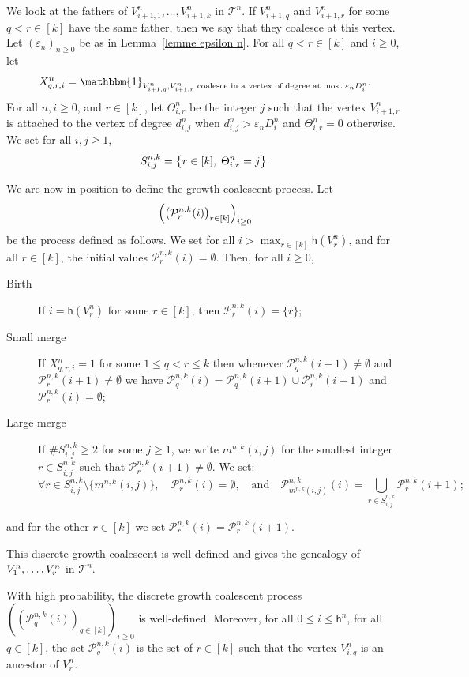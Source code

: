 \documentclass[10pt]{amsart}
\theoremstyle{definition}\newtheorem{defi}[theo]{Definition}\newtheorem{rema}[theo]{Remark}\newtheorem{exam}[theo]{Example}\newtheorem{exem}[theo]{Example}\newtheorem{nota}[theo]{Notation}
\newcommand{\e}{\varepsilon}
\newcommand{\1}{\mathbbm{1}}
\newcommand{\Part}{\mathcal{P}}
\newcommand{\T}{\mathcal{T}}
\newcommand{\h}{\mathsf{h}}
\let\originalleft\left
\let\originalright\right
\renewcommand{\left}{\mathopen{}\mathclose\bgroup\originalleft}
\renewcommand{\right}{\aftergroup\egroup\originalright}
\let\oldforall\forall
\renewcommand*{\forall}{\mathrel{\oldforall}}
\begin{document}
We look at the fathers of $V^n_{i+1,1}, \dots,V^n_{i+1,k}$ in $\T^n$. If $V^n_{i+1,q}$ and $V^n_{i+1,r}$ for some $q<r \in [k]$ have the same father, then we say that they coalesce at this vertex. Let $(\e_n)_{n\ge 0}$ be as in Lemma~\ref{lemme epsilon n}. For all $q<r \in [k]$ and $i \ge 0$, let
\begin{equation}\label{eq indicatrice petite coalescence}
X^n_{q,r,i} = \1_{V^n_{i+1,q}, V^n_{i+1,r}
\text{ coalesce in a vertex of degree at most } \e_n D^n_i}.
\end{equation}
For all $n,i\ge 0$, and $r \in [k]$, let $\Theta_{i,r}^n$ be the integer $j$ such that the vertex $V^n_{i+1,r}$ is attached to the vertex of degree $d^n_{i,j}$ when $d^n_{i,j}> \e_n D^n_i$ and $\Theta_{i,r}^n=0$ otherwise. We set for all $i,j \ge 1$,
\[
S^{n,k}_{i,j} = \left\{ r \in [k], \; \Theta^n_{i,r}=j\right\}.
\]

We are now in position to define the growth-coalescent process. Let 
\[
\left(\left(\Part^{n,k}_r(i)\right)_{r \in [k]}\right)_{i\ge 0}
\]
be the process defined as follows. We set for all $i >\max_{r \in [k]} \h(V^n_r)$, and for all $r \in [k]$, the initial values $ \Part^{n,k}_r(i) = \emptyset$. Then, for all $i\ge 0$,
\begin{description}
\item[{Birth}] If $i=\h(V^n_r)$ for some $r \in [k]$, then $\Part_r^{n,k}(i)=\{r\}$;
\item[{Small merge}] If $X^n_{q,r,i}=1$ for some $1 \le q<r\le k$ then whenever $\Part_q^{n,k}(i+1)\neq \emptyset$ and $\Part_{r}^{n,k}(i+1)\neq \emptyset$ we have $\Part_q^{n,k}(i)=\Part_q^{n,k}(i+1)\cup \Part_{r}^{n,k}(i+1)$ and $\Part_r^{n,k}(i)=\emptyset$;
\item[{Large merge}] If $\# S^{n,k}_{i,j} \ge 2$ for some $j\ge 1$, we write $m^{n,k}(i,j)$ for the smallest integer $r\in S^{n,k}_{i,j}$ such that $\Part_r^{n,k}(i+1)\neq \emptyset$. We set:
\[
\forall r \in S^{n,k}_{i,j} \setminus \{ m^{n,k}(i,j)\}, \quad \Part_r^{n,k}(i)=\emptyset, \quad \text{and} \quad \Part_{m^{n,k}(i,j)}^{n,k}(i)=\bigcup_{r\in S^{n,k}_{i,j}} \Part_{r}^{n,k}(i+1);
\]
\end{description}
and for the other $r \in [k]$ we set $\Part_r^{n,k}(i)= \Part_r^{n,k} (i+1)$.

This discrete growth-coalescent is well-defined and gives the genealogy of $V^n_1, \dots,\linebreak V^n_r$ in $\T^n$.

\begin{prop}
With high probability, the discrete growth coalescent process $(( \Part^{n,k}_q(i))_{q \in [k]})_{i\ge 0}$ is well-defined. Moreover, for all $0 \le i \le \h^n$, {for all $q \in [k]$,} the set $ \Part^{n,k}_q(i)$ is the set of $r \in [k]$ such that the vertex $V^n_{i,q}$ is an ancestor of $V^n_r$.
\end{prop}
\end{document}
